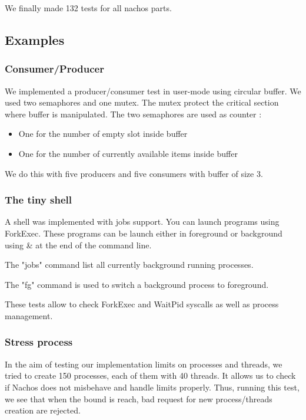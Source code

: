 We finally made 132 tests for all nachos parts. 

\subsection{Examples}
\subsubsection{Consumer/Producer}
We implemented a producer/consumer test in user-mode using circular buffer.
We used two semaphores and one mutex. The mutex protect the critical section
where buffer is manipulated. The two semaphores are used as counter :
\begin{itemize}
    \item One for the number of empty slot inside buffer
    \item One for the number of currently available items inside buffer
\end{itemize}

We do this with five producers and five consumers with buffer of size 3.

\subsubsection{The tiny shell}
A shell was implemented with jobs support. You can launch programs using
ForkExec.
These programs can be launch either in foreground or background using \& at
the end of the command line.

The "jobs" command list all currently background running processes.

The "fg" command is used to switch a background process to foreground.

These tests allow to check ForkExec and WaitPid syscalls as well as process
management.

\subsubsection{Stress process}
In the aim of testing our implementation limits on processes and threads, we
tried to create 150 processes, each of them with 40 threads.
It allows us to check if Nachos does not misbehave and handle limits properly.
Thus, running this test, we see that when the bound is reach, bad request for
new process/threads creation are rejected.

